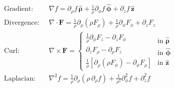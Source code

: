 \begin{align*}
\text{Gradient:}   \;\; &\nabla f = \partial_\rho f\,\bm{\hat{\rho}} 
                                 + \frac{1}{\rho}\partial_\phi f\,\bm{\hat{\phi}} 
                                 + \partial_z f\,\hat{\mathbf{z}} \\[2pt]
\text{Divergence:} \;\; &\nabla \cdot \mathbf{F} = \frac{1}{\rho}\partial_\rho (\rho F_\rho) 
                                 + \frac{1}{\rho}\partial_\phi F_\phi 
                                 + \partial_z F_z \\[2pt]
\text{Curl:}       \;\; &\nabla \times \mathbf{F} = \begin{cases}
                                  \frac{1}{\rho}\partial_\phi F_z - \partial_z F_\phi \\[4pt]
                                  \partial_z F_\rho - \partial_\rho F_z \\[4pt]
                                  \frac{1}{\rho}\left[\partial_\rho (\rho F_\phi) - \partial_\phi F_\rho\right]
                                  \end{cases}
                                  \begin{matrix}
                                  \text{in } \bm{\hat{\rho}} \\[4pt]
                                  \text{in } \bm{\hat{\phi}} \\[4pt]
                                  \text{in } \hat{\mathbf{z}}
                                  \end{matrix} \\[2pt]
\text{Laplacian:}  \;\; &\nabla^2 f = \frac{1}{\rho}\partial_\rho \left(\rho\,\partial_\rho f\right) 
                                 + \frac{1}{\rho^2}\partial^2_\phi f 
                                 + \partial^2_z f
\end{align*}